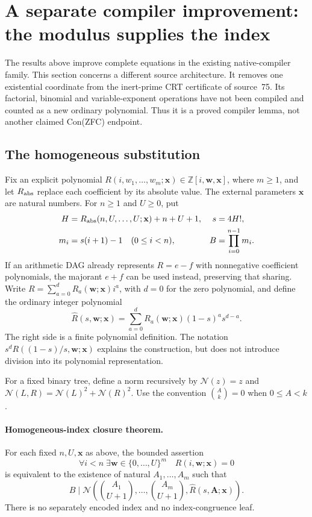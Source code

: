 \section{A separate compiler improvement: the modulus supplies the index}
\label{sec:homogeneous-closure}

The results above improve complete equations in the existing native-compiler
family.  This section concerns a different source architecture.  It removes
one existential coordinate from the inert-prime CRT certificate of source~75.
Its factorial, binomial and variable-exponent operations have not been
compiled and counted as a new ordinary polynomial.  Thus it is a proved
compiler lemma, not another claimed Con(ZFC) endpoint.

\subsection{The homogeneous substitution}

Fix an explicit polynomial
\(R(i,w_1,\ldots,w_m;\mathbf x)\in\mathbb Z[i,\mathbf w,\mathbf x]\),
where \(m\ge1\), and let \(R_{\rm abs}\) replace each coefficient by its
absolute value.  The external parameters \(\mathbf x\) are natural numbers.
For \(n\ge1\) and \(U\ge0\), put
\begin{align*}
 H&=R_{\rm abs}(n,U,\ldots,U;\mathbf x)+n+U+1,&
 s&=4H!,\\
 m_i&=s(i+1)-1\quad(0\le i<n),&
 B&=\prod_{i=0}^{n-1}m_i.
\end{align*}
If an arithmetic DAG already represents \(R=e-f\) with nonnegative
coefficient polynomials, the majorant \(e+f\) can be used instead, preserving
that sharing.  Write \(R=\sum_{a=0}^d R_a(\mathbf w;\mathbf x)i^a\), with
\(d=0\) for the zero polynomial, and define the ordinary integer polynomial
\begin{equation}
 \widehat R(s,\mathbf w;\mathbf x)
 =\sum_{a=0}^{d}R_a(\mathbf w;\mathbf x)(1-s)^a s^{d-a}.
 \label{eq:homogeneous-index}
\end{equation}
The right side is a finite polynomial definition.  The notation
\(s^dR((1-s)/s,\mathbf w;\mathbf x)\) explains the construction, but does
not introduce division into its polynomial representation.

For a fixed binary tree, define a norm recursively by
\(\mathcal N(z)=z\) and
\(\mathcal N(L,R)=\mathcal N(L)^2+\mathcal N(R)^2\).
Use the convention \(\binom Ak=0\) when \(0\le A<k\).

\paragraph{Homogeneous-index closure theorem.}
For each fixed \(n,U,\mathbf x\) as above, the bounded assertion
\[
 \forall i<n\;\exists\mathbf w\in\{0,\ldots,U\}^{m}
                    \quad R(i,\mathbf w;\mathbf x)=0
\]
is equivalent to the existence of natural \(A_1,\ldots,A_m\) such that
\begin{equation}
 B\mid\mathcal N\left(
   \binom{A_1}{U+1},\ldots,\binom{A_m}{U+1},
   \widehat R(s,\mathbf A;\mathbf x)\right).
 \label{eq:homogeneous-certificate}
\end{equation}
There is no separately encoded index and no index-congruence leaf.

